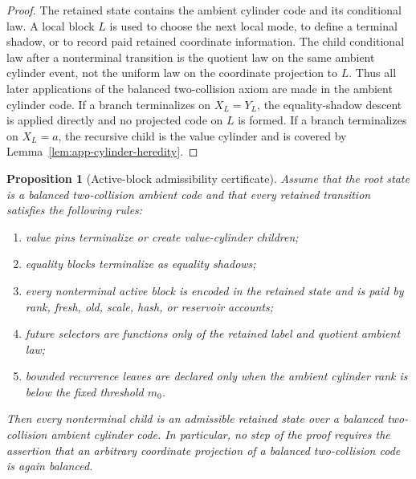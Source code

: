 \documentclass[11pt]{article}
\newtheorem{proposition}[theorem]{Proposition}
\theoremstyle{remark}
\begin{document}
\begin{proof}
The retained state contains the ambient cylinder code and its conditional law.  A local block $L$ is used to choose the next local mode, to define a terminal shadow, or to record paid retained coordinate information.  The child conditional law after a nonterminal transition is the quotient law on the same ambient cylinder event, not the uniform law on the coordinate projection to $L$.  Thus all later applications of the balanced two-collision axiom are made in the ambient cylinder code.  If a branch terminalizes on $X_L=Y_L$, the equality-shadow descent is applied directly and no projected code on $L$ is formed.  If a branch terminalizes on $X_L=a$, the recursive child is the value cylinder and is covered by Lemma~\ref{lem:app-cylinder-heredity}.
\end{proof}

\begin{proposition}[Active-block admissibility certificate]\label{prop:app-active-admissibility}
Assume that the root state is a balanced two-collision ambient code and that every retained transition satisfies the following rules:
\begin{enumerate}[label=\textup{(\roman*)}]
\item value pins terminalize or create value-cylinder children;
\item equality blocks terminalize as equality shadows;
\item every nonterminal active block is encoded in the retained state and is paid by rank, fresh, old, scale, hash, or reservoir accounts;
\item future selectors are functions only of the retained label and quotient ambient law;
\item bounded recurrence leaves are declared only when the ambient cylinder rank is below the fixed threshold $m_0$.
\end{enumerate}
Then every nonterminal child is an admissible retained state over a balanced two-collision ambient cylinder code.  In particular, no step of the proof requires the assertion that an arbitrary coordinate projection of a balanced two-collision code is again balanced.
\end{proposition}
\end{document}
